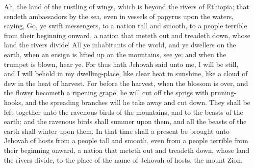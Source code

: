 Ah, the land of the rustling of wings, which is beyond the rivers of Ethiopia; that sendeth ambassadors by the sea, even in vessels of papyrus upon the waters, saying, Go, ye swift messengers, to a nation tall and smooth, to a people terrible from their beginning onward, a nation that meteth out and treadeth down, whose land the rivers divide! All ye inhabitants of the world, and ye dwellers on the earth, when an ensign is lifted up on the mountains, see ye; and when the trumpet is blown, hear ye.  For thus hath Jehovah said unto me, I will be still, and I will behold in my dwelling-place, like clear heat in sunshine, like a cloud of dew in the heat of harvest. For before the harvest, when the blossom is over, and the flower becometh a ripening grape, he will cut off the sprigs with pruning-hooks, and the spreading branches will he take away and cut down. They shall be left together unto the ravenous birds of the mountains, and to the beasts of the earth; and the ravenous birds shall summer upon them, and all the beasts of the earth shall winter upon them. In that time shall a present be brought unto Jehovah of hosts from a people tall and smooth, even from a people terrible from their beginning onward, a nation that meteth out and treadeth down, whose land the rivers divide, to the place of the name of Jehovah of hosts, the mount Zion. 

